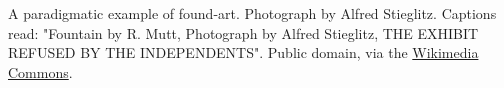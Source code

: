A paradigmatic example of found-art. Photograph by Alfred Stieglitz. Captions read: "Fountain by R. Mutt, Photograph by Alfred Stieglitz, THE EXHIBIT REFUSED BY THE INDEPENDENTS".  Public domain, via the \href{https://commons.wikimedia.org/w/index.php?title=File:Duchamp_Fountaine.jpg&oldid=133561865}{Wikimedia Commons}.